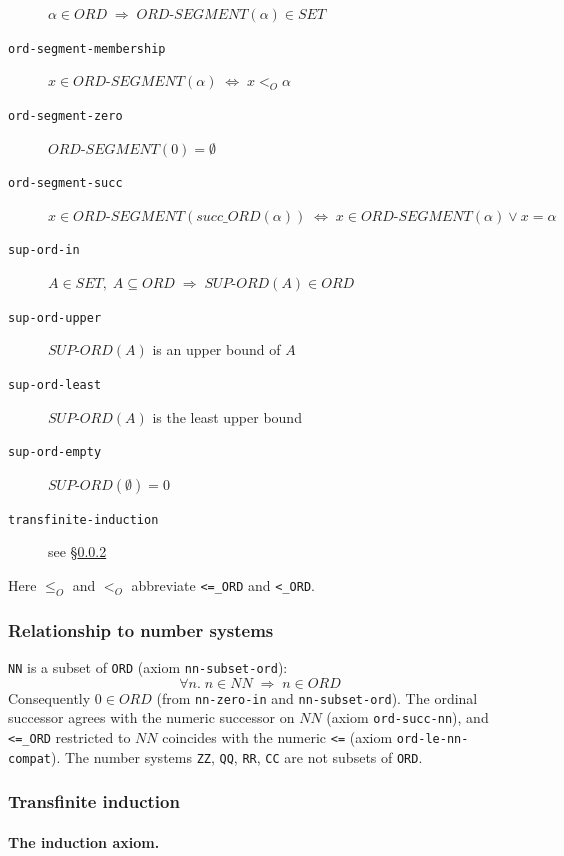 \documentclass{amsbook}[openany]
\theoremstyle{definition}
\theoremstyle{remark}
\theoremstyle{remark}
\begin{document}
\begin{description}
  $\alpha \in \mathit{ORD} \;\Rightarrow\; \mathit{ORD\text{-}SEGMENT}(\alpha) \in \mathit{SET}$
\item[\texttt{ord-segment-membership}]
  $x \in \mathit{ORD\text{-}SEGMENT}(\alpha) \;\Leftrightarrow\; x <_O \alpha$
\item[\texttt{ord-segment-zero}]
  $\mathit{ORD\text{-}SEGMENT}(0) = \emptyset$
\item[\texttt{ord-segment-succ}]
  $x \in \mathit{ORD\text{-}SEGMENT}(\mathit{succ\_ORD}(\alpha)) \;\Leftrightarrow\; x \in \mathit{ORD\text{-}SEGMENT}(\alpha) \lor x = \alpha$
\item[\texttt{sup-ord-in}]
  $A \in \mathit{SET},\; A \subseteq \mathit{ORD} \;\Rightarrow\; \mathit{SUP\text{-}ORD}(A) \in \mathit{ORD}$
\item[\texttt{sup-ord-upper}]
  $\mathit{SUP\text{-}ORD}(A)$ is an upper bound of $A$
\item[\texttt{sup-ord-least}]
  $\mathit{SUP\text{-}ORD}(A)$ is the least upper bound
\item[\texttt{sup-ord-empty}]
  $\mathit{SUP\text{-}ORD}(\emptyset) = 0$
\item[\texttt{transfinite-induction}]
  see \S\ref{sec:ord-induction}
\end{description}

Here $\leq_O$ and $<_O$ abbreviate \texttt{<=\_ORD} and \texttt{<\_ORD}.

\subsubsection{Relationship to number systems}

\texttt{NN} is a subset of \texttt{ORD} (axiom \texttt{nn-subset-ord}):
\[
  \forall n.\; n \in \mathit{NN} \;\Rightarrow\; n \in \mathit{ORD}
\]
Consequently $0 \in \mathit{ORD}$ (from \texttt{nn-zero-in} and
\texttt{nn-subset-ord}).  The ordinal successor agrees with the numeric
successor on $\mathit{NN}$ (axiom \texttt{ord-succ-nn}), and
\texttt{<=\_ORD} restricted to $\mathit{NN}$ coincides with the numeric
\texttt{<=} (axiom \texttt{ord-le-nn-compat}).  The number systems
\texttt{ZZ}, \texttt{QQ}, \texttt{RR}, \texttt{CC} are not subsets of
\texttt{ORD}.

\subsubsection{Transfinite induction}
\label{sec:ord-induction}

\paragraph{The induction axiom.}
\end{document}
